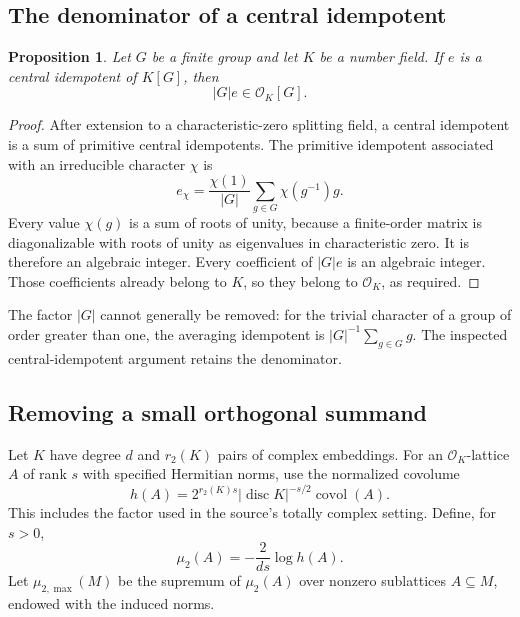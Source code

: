 \documentclass[11pt,a4paper]{article}
\newtheorem{proposition}{Proposition}[section]
\theoremstyle{remark}
\newcommand{\OO}{\mathcal O}
\newcommand{\src}[1]{\cite{#1}}
\begin{document}
\subsection{The denominator of a central idempotent}
\begin{proposition}\label{prop:idempotent}
Let $G$ be a finite group and let $K$ be a number field. If $e$ is a central idempotent of $K[G]$, then
\[
 |G|e\in\OO_K[G].
\]
\end{proposition}
\begin{proof}
After extension to a characteristic-zero splitting field, a central idempotent is a sum of primitive central idempotents. The primitive idempotent associated with an irreducible character $\chi$ is
\[
 e_\chi=\frac{\chi(1)}{|G|}
          \sum_{g\in G}\chi(g^{-1})g.
\]
Every value $\chi(g)$ is a sum of roots of unity, because a finite-order matrix is diagonalizable with roots of unity as eigenvalues in characteristic zero. It is therefore an algebraic integer. Every coefficient of $|G|e$ is an algebraic integer. Those coefficients already belong to $K$, so they belong to $\OO_K$, as required.
\end{proof}
The factor $|G|$ cannot generally be removed: for the trivial character of a group of order greater than one, the averaging idempotent is $|G|^{-1}\sum_{g\in G}g$. The inspected central-idempotent argument retains the denominator. \src{S-idempotent}

\subsection{Removing a small orthogonal summand}
Let $K$ have degree $d$ and $r_2(K)$ pairs of complex embeddings. For an $\OO_K$-lattice $A$ of rank $s$ with specified Hermitian norms, use the normalized covolume
\[
 h(A)=2^{r_2(K)s}|\operatorname{disc}K|^{-s/2}
                   \operatorname{covol}(A).
\]
This includes the factor used in the source's totally complex setting. Define, for $s>0$,
\[
 \mu_2(A)=-\frac{2}{ds}\log h(A).
\]
Let $\mu_{2,\max}(M)$ be the supremum of $\mu_2(A)$ over nonzero sublattices $A\subseteq M$, endowed with the induced norms.
\end{document}
